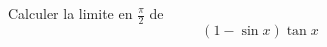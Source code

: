 Calculer la limite en $\frac{\pi}{2}$ de
\begin{displaymath}
 (1-\sin x)\tan x
\end{displaymath}
\bigskip 
